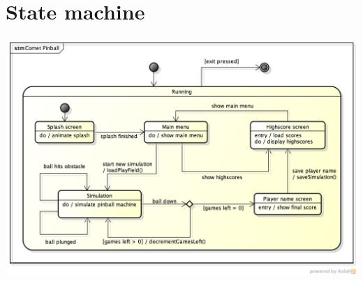\documentclass[fontsize=12pt,
               paper=a4,
               twoside=false,
               parskip=half,
               ]{scrartcl}
\begin{document}
\section{State machine}
\includegraphics[width=15.5cm]{./img/state-machine.png}
\end{document}
